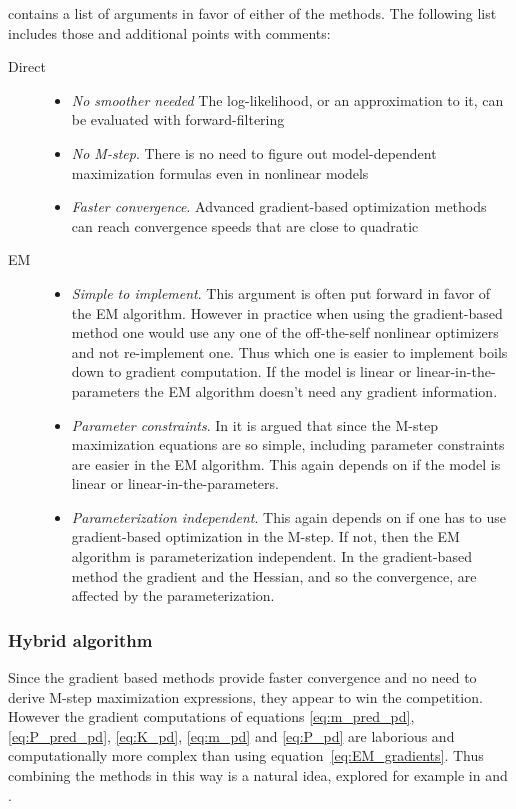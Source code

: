 \textcite{Cappe2005} contains a list of arguments in favor of either of the methods. The following list includes
those and additional points with comments:
\begin{description}
  \item[Direct]\hfill
\begin{itemize}
  \item\emph{No smoother needed} The log-likelihood, or an approximation to it, can be evaluated
  with forward-filtering
  \item\emph{No M-step}. There is no need to figure out model-dependent maximization
  formulas even in nonlinear models 
  \item\emph{Faster convergence}. Advanced gradient-based optimization
  methods can reach convergence speeds that are close to quadratic
\end{itemize}
  \item[EM]\hfill
  \begin{itemize}
  \item \emph{Simple to implement}. This argument is often put forward in favor of the EM
 algorithm. However in practice when using the gradient-based method one would use any one of
the off-the-self nonlinear optimizers and not re-implement one. Thus which one is easier to implement
boils down to gradient computation. If the model is linear or linear-in-the-parameters the EM
algorithm doesn't need any gradient information.
  \item\emph{Parameter constraints}. In \textcite{Cappe2005} it is argued that
since the M-step maximization equations are so simple, including parameter constraints
are easier in the EM algorithm. This again depends on if the model is linear or linear-in-the-parameters.
  \item\emph{Parameterization independent}. This again depends on if one has to use gradient-based
 optimization in the M-step. If not, then the EM algorithm is parameterization independent. In the gradient-based
 method the gradient and the Hessian, and so the convergence, are affected by the parameterization.
\end{itemize} 
\end{description}
 
 \subsubsection{Hybrid algorithm}
 
 Since the gradient based methods provide faster convergence and no need to
 derive M-step maximization expressions, they appear to win the competition.
 However the gradient computations of equations
 \eqref{eq:m_pred_pd}, \eqref{eq:P_pred_pd}, \eqref{eq:K_pd}, \eqref{eq:m_pd} and \eqref{eq:P_pd} 
 are laborious and computationally more complex than using equation~\eqref{eq:EM_gradients}.
Thus combining the methods in this way is a natural idea, explored for example in \textcite{Salakhutdinov2003a}
and \textcite{Olsson2007}.
 



